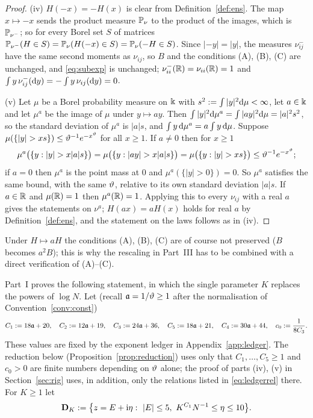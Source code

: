 \begin{proof}
(iv) $H(-x)=-H(x)$ is clear from Definition~\ref{def:ens}. The map $x\mapsto-x$ sends the product measure $\mathbb{P}_\nu$ to the product of the images, which is $\mathbb{P}_{\nu^-}$; so for every Borel set $S$ of matrices
$\mathbb{P}_{\nu^-}(H\in S)=\mathbb{P}_\nu(H(-x)\in S)=\mathbb{P}_\nu(-H\in S)$. Since $|-y|=|y|$, the measures $\nu^-_{ij}$ have the same second moments as $\nu_{ij}$, so $B$ and the conditions (A), (B), (C) are unchanged, and
\eqref{eq:subexp} is unchanged; $\nu^-_{ii}(\mathbb{R})=\nu_{ii}(\mathbb{R})=1$ and $\int y\,\nu^-_{ij}(\mathrm{d} y)=-\int y\,\nu_{ij}(\mathrm{d} y)=0$.

(v) Let $\mu$ be a Borel probability measure on $\Bbbk$ with $s^2:=\int|y|^2\mathrm{d}\mu<\infty$, let $a\in\Bbbk$ and let $\mu^a$ be the image of $\mu$ under $y\mapsto ay$. Then $\int|y|^2\mathrm{d}\mu^a=\int|ay|^2\mathrm{d}\mu=|a|^2s^2$, so the standard deviation of $\mu^a$ is $|a|s$,
and $\int y\,\mathrm{d}\mu^a=a\int y\,\mathrm{d}\mu$. Suppose $\mu(\{|y|>xs\})\le\vth^{-1}e^{-x^\vth}$ for all $x\ge1$. If $a\ne0$ then for $x\ge1$
\[
 \mu^a\big(\{y:|y|>x|a|s\}\big)=\mu\big(\{y:|ay|>x|a|s\}\big)=\mu\big(\{y:|y|>xs\}\big)\le\vth^{-1}e^{-x^\vth};
\]
if $a=0$ then $\mu^a$ is the point mass at $0$ and $\mu^a(\{|y|>0\})=0$. So $\mu^a$ satisfies the same bound, with the same $\vartheta$, relative to its own standard deviation $|a|s$. If $a\in\mathbb{R}$ and $\mu(\mathbb{R})=1$ then $\mu^a(\mathbb{R})=1$.
Applying this to every $\nu_{ij}$ with a real $a$ gives the statements on $\nu^a$; $H(ax)=aH(x)$ holds for real $a$ by Definition~\ref{def:ens}, and the statement on the laws follows as in (iv).
\end{proof}
\noindent Under $H\mapsto aH$ the conditions (A), (B), (C) are of course not preserved ($B$ becomes $a^2B$); this is why the rescaling in Part~III has to be combined with a direct verification of (A)--(C).


Part~I proves the following statement, in which the single parameter $K$ replaces the powers of $\log N$.
Let (recall $\mathfrak{a}=1/\vartheta\ge1$ after the normalisation of Convention~\ref{conv:const})
\begin{equation}\label{eq:ledger0}
 C_1:=18\mathfrak{a}+20,\quad C_2:=12\mathfrak{a}+19,\quad C_3:=24\mathfrak{a}+36,\quad C_5:=18\mathfrak{a}+21,\quad C_4:=30\mathfrak{a}+44,\quad c_0:=\frac1{8C_3}.
\end{equation}
These values are fixed by the exponent ledger in Appendix~\ref{app:ledger}. The reduction below (Proposition~\ref{prop:reduction}) uses only that $C_1,\dots,C_5\ge1$ and $c_0>0$ are finite numbers depending on $\vartheta$ alone;
the proof of parts (iv), (v) in Section~\ref{sec:rig} uses, in addition, only the relations listed in \eqref{eq:ledgerrel} there. For $K\ge1$ let
\begin{equation}\label{eq:DK}
 \bD_K:=\big\{z=E+\ii\eta:\ |E|\le5,\ K^{C_1}N^{-1}\le\eta\le10\big\}.
\end{equation}


